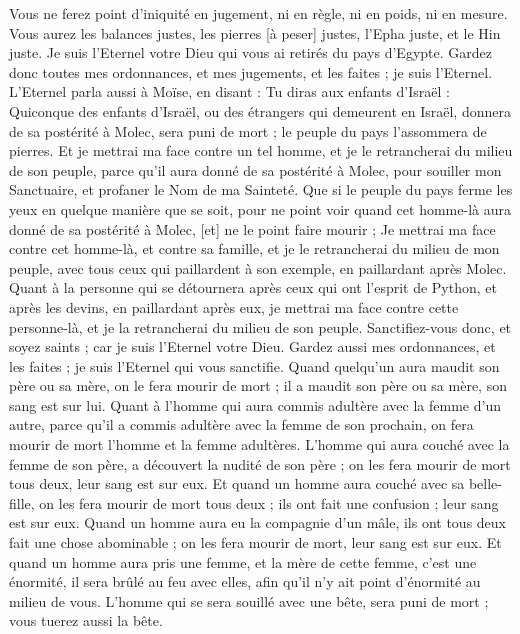 \begin{multicols}{2}
Vous ne ferez point d'iniquité en jugement, ni en règle, ni en poids, ni en mesure.
Vous aurez les balances justes, les pierres [à peser] justes, l'Epha juste, et le Hin juste. Je suis l'Eternel votre Dieu qui vous ai retirés du pays d'Egypte.
Gardez donc toutes mes ordonnances, et mes jugements, et les faites ; je suis l'Eternel.
\VerseOne{}L'Eternel parla aussi à Moïse, en disant :
Tu diras aux enfants d'Israël : Quiconque des enfants d'Israël, ou des étrangers qui demeurent en Israël, donnera de sa postérité à Molec, sera puni de mort ; le peuple du pays l'assommera de pierres.
Et je mettrai ma face contre un tel homme, et je le retrancherai du milieu de son peuple, parce qu'il aura donné de sa postérité à Molec, pour souiller mon Sanctuaire, et profaner le Nom de ma Sainteté.
Que si le peuple du pays ferme les yeux en quelque manière que se soit, pour ne point voir quand cet homme-là aura donné de sa postérité à Molec, [et] ne le point faire mourir ;
Je mettrai ma face contre cet homme-là, et contre sa famille, et je le retrancherai du milieu de mon peuple, avec tous ceux qui paillardent à son exemple, en paillardant après Molec.
Quant à la personne qui se détournera après ceux qui ont l'esprit de Python, et après les devins, en paillardant après eux, je mettrai ma face contre cette personne-là, et je la retrancherai du milieu de son peuple.
Sanctifiez-vous donc, et soyez saints ; car je suis l'Eternel votre Dieu.
Gardez aussi mes ordonnances, et les faites ; je suis l'Eternel qui vous sanctifie.
Quand quelqu'un aura maudit son père ou sa mère, on le fera mourir de mort ; il a maudit son père ou sa mère, son sang est sur lui.
Quant à l'homme qui aura commis adultère avec la femme d'un autre, parce qu'il a commis adultère avec la femme de son prochain, on fera mourir de mort l'homme et la femme adultères.
L'homme qui aura couché avec la femme de son père, a découvert la nudité de son père ; on les fera mourir de mort tous deux, leur sang est sur eux.
Et quand un homme aura couché avec sa belle-fille, on les fera mourir de mort tous deux ; ils ont fait une confusion ; leur sang est sur eux.
Quand un homme aura eu la compagnie d'un mâle, ils ont tous deux fait une chose abominable ; on les fera mourir de mort, leur sang est sur eux.
Et quand un homme aura pris une femme, et la mère de cette femme, c'est une énormité, il sera brûlé au feu avec elles, afin qu'il n'y ait point d'énormité au milieu de vous.
L'homme qui se sera souillé avec une bête, sera puni de mort ; vous tuerez aussi la bête.

\end{multicols}
